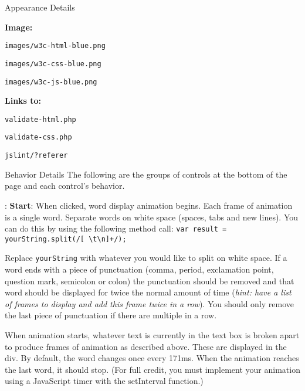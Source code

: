 \documentclass[programming]{../../mfcs}
\begin{document}
\begin{question}{Appearance Details}
  \begin{minipage}{.5\textwidth}
  \textbf{Image:}

    \texttt{images/w3c-html-blue.png}

    \texttt{images/w3c-css-blue.png}

    \texttt{images/w3c-js-blue.png}
  \end{minipage}
  \begin{minipage}{.5\textwidth}
  \textbf{Links to:}

  \texttt{validate-html.php}

  \texttt{validate-css.php}

  \texttt{jslint/?referer}
  \end{minipage}
\end{question}

\begin{question}{Behavior Details}
The following are the groups of controls at the bottom of the page and each control's behavior.
\newline

\textbf{\color{colour}{Play Controls}}:
\newline
\textbf{Start}: When clicked, word display animation begins. Each frame of animation is a single word. Separate words on
white space (spaces, tabs and new lines). 
\newline You can do this by using the following method call:
  \texttt{var result = yourString.split(/[ {\textbackslash}t{\textbackslash}n]+/);}
\newline

Replace \texttt{yourString} with whatever you would like to split on white space. If a word ends with a 
piece of punctuation (comma, period, exclamation point, question mark, semicolon or colon)
the punctuation should be removed and that word should be displayed for twice the normal amount of
  time (\emph{hint:
  have a list of frames to display and add this frame twice in a row}). You should only remove the last piece of
punctuation if there are multiple in a row.
\newline

When animation starts, whatever text is currently in the text box is broken apart to produce frames of animation as
described above. These are displayed in the div. By default, the word changes once every 171ms. When the
animation reaches the last word, it should stop. (For full credit, you must implement your animation using a JavaScript timer with the setInterval function.)
\newline


\end{question}
\end{document}
